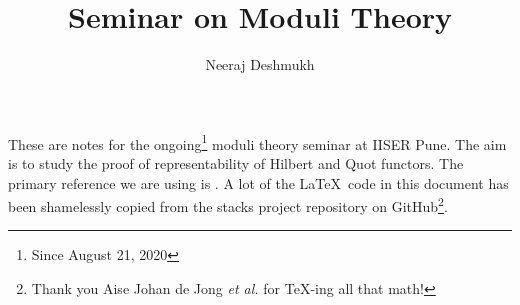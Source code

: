 \documentclass[11pt]{amsart}
\makeatletter
\def\subtitle#1{\gdef\@subtitle{#1}}
\def\@subtitle{}
\theoremstyle{definition}
\makeatother
\begin{document}
\title{Seminar on Moduli Theory}
\subtitle{\today}
\author{Neeraj Deshmukh}

\maketitle


These are notes for the ongoing\footnote{Since August 21, 2020} moduli theory seminar at IISER Pune. The aim is to study the proof of representability of Hilbert and Quot functors. The primary reference we are using is \cite{FGAExplained}. A lot of the \LaTeX\, code in this document has been shamelessly copied from the stacks project repository on GitHub\footnote{Thank you Aise Johan de Jong \textit{et al.} for TeX-ing all that math!}.
\end{document}
